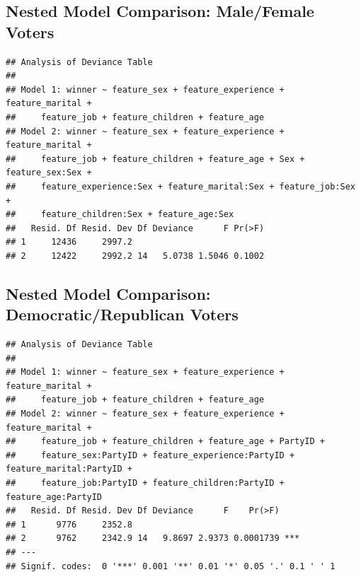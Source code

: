 \documentclass[a4paper,12pt]{article}\usepackage[]{graphicx}\usepackage[]{color}
\makeatletter
\newenvironment{kframe}{%
 \def\at@end@of@kframe{}%
 \ifinner\ifhmode%
  \def\at@end@of@kframe{\end{minipage}}%
  \begin{minipage}{\columnwidth}%
 \fi\fi%
 \def\FrameCommand##1{\hskip\@totalleftmargin \hskip-\fboxsep
 \colorbox{shadecolor}{##1}\hskip-\fboxsep
     \hskip-\linewidth \hskip-\@totalleftmargin \hskip\columnwidth}%
 \MakeFramed {\advance\hsize-\width
   \@totalleftmargin\z@ \linewidth\hsize
   \@setminipage}}%
 {\par\unskip\endMakeFramed%
 \at@end@of@kframe}
\newenvironment{knitrout}{}{} %
\makeatother
\begin{document}
\clearpage

\subsection{Nested Model Comparison: Male/Female Voters}


\begin{knitrout}
\color{fgcolor}\begin{kframe}
\begin{verbatim}
## Analysis of Deviance Table
## 
## Model 1: winner ~ feature_sex + feature_experience + feature_marital + 
##     feature_job + feature_children + feature_age
## Model 2: winner ~ feature_sex + feature_experience + feature_marital + 
##     feature_job + feature_children + feature_age + Sex + feature_sex:Sex + 
##     feature_experience:Sex + feature_marital:Sex + feature_job:Sex + 
##     feature_children:Sex + feature_age:Sex
##   Resid. Df Resid. Dev Df Deviance      F Pr(>F)
## 1     12436     2997.2                          
## 2     12422     2992.2 14   5.0738 1.5046 0.1002
\end{verbatim}
\end{kframe}
\end{knitrout}

\subsection{Nested Model Comparison: Democratic/Republican Voters}

\begin{knitrout}
\color{fgcolor}\begin{kframe}
\begin{verbatim}
## Analysis of Deviance Table
## 
## Model 1: winner ~ feature_sex + feature_experience + feature_marital + 
##     feature_job + feature_children + feature_age
## Model 2: winner ~ feature_sex + feature_experience + feature_marital + 
##     feature_job + feature_children + feature_age + PartyID + 
##     feature_sex:PartyID + feature_experience:PartyID + feature_marital:PartyID + 
##     feature_job:PartyID + feature_children:PartyID + feature_age:PartyID
##   Resid. Df Resid. Dev Df Deviance      F    Pr(>F)    
## 1      9776     2352.8                                 
## 2      9762     2342.9 14   9.8697 2.9373 0.0001739 ***
## ---
## Signif. codes:  0 '***' 0.001 '**' 0.01 '*' 0.05 '.' 0.1 ' ' 1
\end{verbatim}
\end{kframe}
\end{knitrout}
\end{document}
